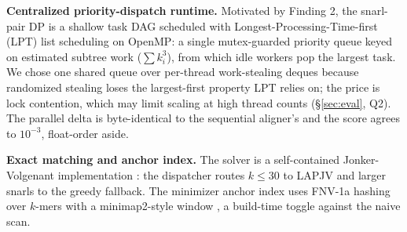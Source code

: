 \textbf{Centralized priority-dispatch runtime.}
Motivated by Finding 2, the snarl-pair DP is a shallow task DAG scheduled with Longest-Processing-Time-first (LPT) list scheduling \cite{graham1969bounds} on OpenMP: a single mutex-guarded priority queue keyed on estimated subtree work ($\sum k_i^3$), from which idle workers pop the largest task. We chose one shared queue over per-thread work-stealing deques because randomized stealing loses the largest-first property LPT relies on; the price is lock contention, which may limit scaling at high thread counts (\S\ref{sec:eval}, Q2). The parallel delta is byte-identical to the sequential aligner's and the score agrees to $10^{-3}$, float-order aside.

\textbf{Exact matching and anchor index.}
The solver is a self-contained Jonker-Volgenant implementation \cite{jonker1987shortest}: the dispatcher routes $k\le 30$ to LAPJV and larger snarls to the greedy fallback. The minimizer anchor index uses FNV-1a hashing over $k$-mers with a minimap2-style window \cite{li2018minimap2}, a build-time toggle against the naive scan.
